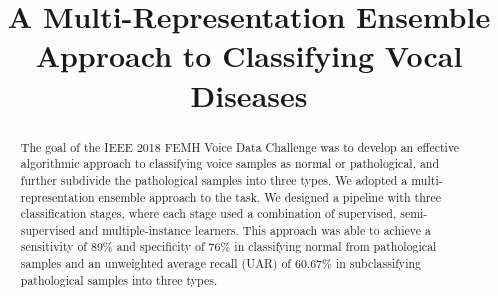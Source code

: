\documentclass[conference]{IEEEtran}
\begin{document}
\title{A Multi-Representation Ensemble Approach to Classifying Vocal Diseases}
\author{
}
\maketitle
\begin{abstract}
The goal of the IEEE 2018 FEMH Voice Data Challenge was to develop an effective algorithmic approach to classifying voice samples as normal or pathological, and further subdivide the pathological samples into three types. We adopted a multi-representation ensemble approach to the task. We designed a pipeline with three classification stages, where each stage used a combination of supervised, semi-supervised and multiple-instance learners. This approach was able to achieve a sensitivity of 89\% and specificity of 76\% in classifying normal from pathological samples and an unweighted average recall (UAR) of 60.67\% in subclassifying pathological samples into three types.
\end{abstract}




\end{document}
